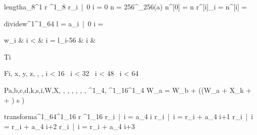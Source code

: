 \documentclass[12pt,a4paper]{book}
\begin{document}
\begin{eqcode}{length}{a}{}{_8^1}
    r \in {}^1_8 \lend
    r_i\  |\  0 \leq i  = 0 \lend
    n = 256^{\lfloor \log_{256}\left(a\right)\rfloor} \lend
    n^{[0]} = n \lend
    r^{[i]}_i =  \lend
    n^{[i]} =  \lend
     \lend
\end{eqcode}

\begin{eqcode}{divide}{w}{^1}{^1_{64}}
    l =  \lend
    a_i\  |\  0 \leq i  = 
        \begin{cases}
            w_i & i <  \lend
              & i =  \lend
            l_{i-56} & i   &  \lend
        \end{cases} \lend
     \lend
\end{eqcode}

\begin{eqcode}{T}{i}{}{}
     \lend
\end{eqcode}

\begin{eqcode}{F}{i, x, y, z}{, , ,
}{}
    \iif i < 16\   \lend
    \iif i < 32\   \lend
    \iif i < 48\   \lend
    \iif i < 64\   \lend
\end{eqcode}

\begin{eqcode}{P}{a,b,c,d,k,s,i,W,X}{, , ,
, , , , ^1_4,
^1_{16}}{^1_4}
    W_a = W_b + ((W_a + X_k +   + ) \ll s ) \lend
     \lend
\end{eqcode}

\begin{eqcode}{transform}{a}{^1_{64}}{^1_{16}}
    r \in {}^1_{16} \lend
    r_i\  |\  \forall i = a_{4 \cdot i}  \lend
    r_i\  |\  \forall i = r_i + a_{4 \cdot i+1}  \lend
    r_i\  |\  \forall i = r_i + a_{4 \cdot i+2}  \lend
    r_i\  |\  \forall i  = r_i + a_{4 \cdot i+3} \lend
     \lend
\end{eqcode}
\end{document}
